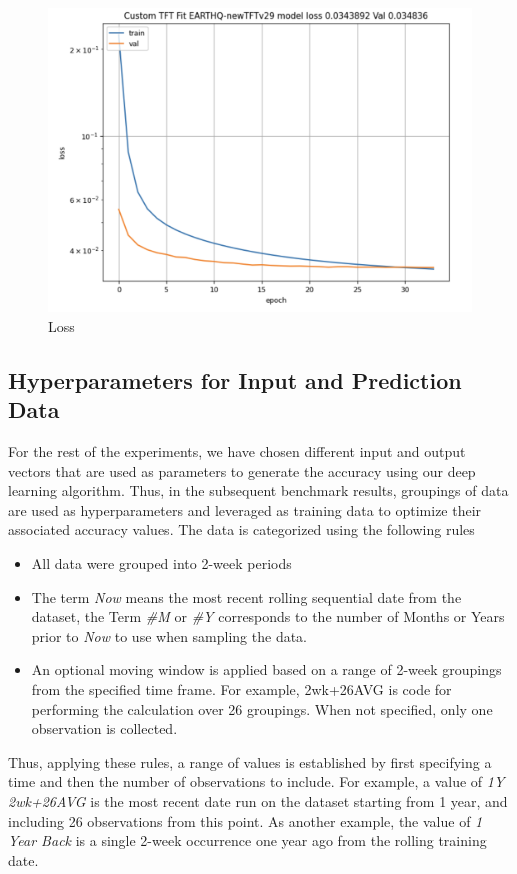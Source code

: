 \documentclass[utf8]{FrontiersinVancouver} %
\begin{document}
\begin{figure}[htb]
    \centering
    \includegraphics[width=0.70\columnwidth]{images/loss.png}
    \caption{Loss}
    \label{fig:loss}
\end{figure}


\subsection{Hyperparameters for Input and Prediction Data}

For the rest of the experiments, we have chosen different input and
output vectors that are used as parameters to generate the accuracy using our deep
learning algorithm. Thus, in the subsequent benchmark results,
groupings of data are used as hyperparameters and leveraged as
training data to optimize their associated accuracy values. The data
is categorized using the following rules

\begin{itemize}
  \item All data were grouped into 2-week periods
  \item The term {\em Now} means the most recent rolling sequential date from the dataset,
        the Term {\em \#M} or {\em \#Y} corresponds to the number of Months or Years
        prior to {\em Now} to use when sampling the data. 
  \item An optional moving window is applied based on a range of 2-week groupings
        from the specified time frame.  For example, 2wk+26AVG is
        code for performing the calculation over 26 groupings.
        When not specified, only one observation is collected.
\end{itemize}

Thus, applying these rules, a range of values is established by first
specifying a time and then the number of observations to include.  For
example, a value of {\em 1Y 2wk+26AVG} is the most recent date run on the dataset
starting from 1 year, and including 26 observations from this point. As
another example, the value of {\em 1 Year Back} is a single 2-week
occurrence one year ago from the rolling training date.
\end{document}
